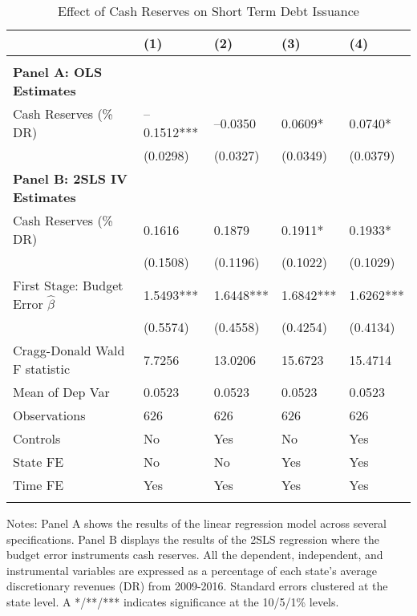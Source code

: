 \documentclass{article}
\begin{document}
\begin{table}[tbp] \centering
{}

\caption{Effect of Cash Reserves on Short Term Debt Issuance}
\label{tab:Regression_StDebt}
\begin{tabularx}{\linewidth}{lCCCC}

\toprule
&{(1)}&{(2)}&{(3)}&{(4)} \tabularnewline \midrule
{}&{}&{}&{}&{} \tabularnewline
\midrule \addlinespace[\belowrulesep]
\textbf{Panel A: OLS Estimates}&&&& \tabularnewline
\midrule Cash Reserves (\% DR)&--0.1512***&--0.0350&0.0609*&0.0740* \tabularnewline
&(0.0298)&(0.0327)&(0.0349)&(0.0379) \tabularnewline
\textbf{Panel B: 2SLS IV Estimates}&&&& \tabularnewline
\midrule Cash Reserves (\% DR)&0.1616&0.1879&0.1911*&0.1933* \tabularnewline
&(0.1508)&(0.1196)&(0.1022)&(0.1029) \tabularnewline
First Stage: Budget Error $\hat{\beta}$&1.5493***&1.6448***&1.6842***&1.6262*** \tabularnewline
&(0.5574)&(0.4558)&(0.4254)&(0.4134) \tabularnewline
Cragg-Donald Wald F statistic&7.7256&13.0206&15.6723&15.4714 \tabularnewline
\midrule Mean of Dep Var&0.0523&0.0523&0.0523&0.0523 \tabularnewline
Observations&626&626&626&626 \tabularnewline
Controls&No&Yes&No&Yes \tabularnewline
State FE&No&No&Yes&Yes \tabularnewline
Time FE&Yes&Yes&Yes&Yes \tabularnewline
\bottomrule \addlinespace[\belowrulesep]

\end{tabularx}
\begin{flushleft}
\footnotesize Notes: Panel A shows the results of the linear regression model across several specifications. Panel B displays the results of the 2SLS regression where the budget error instruments cash reserves. All the dependent, independent, and instrumental variables are expressed as a percentage of each state's average discretionary revenues (DR) from 2009-2016. Standard errors clustered at the state level. A */**/*** indicates significance at the 10/5/1\% levels.
\end{flushleft}
\end{table}
\end{document}
